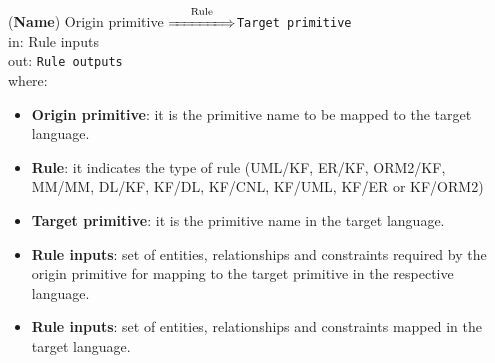 \documentclass[sn-mathphys]{sn-jnl}
\begin{document}
({\bf Name}) Origin primitive $\overset{\text{Rule}}{\xLongrightarrow{\hspace*{1.4cm}}}${\tt Target primitive}\\
\hspace*{0.3cm}in: Rule inputs\\
\hspace*{0.5cm}out: {\tt Rule outputs}\\

where:

\begin{itemize}
\item \textbf{Origin primitive}: it is the primitive name to be mapped to the target language.
\item \textbf{Rule}: it indicates the type of rule (UML/KF, ER/KF, ORM2/KF, MM/MM, DL/KF, KF/DL, KF/CNL, KF/UML, KF/ER or KF/ORM2)
\item \textbf{Target primitive}: it is the primitive name in the target language.
\item \textbf{Rule inputs}: set of entities, relationships and constraints required by the origin primitive for mapping to the target primitive in the respective language.
\item \textbf{Rule inputs}: set of entities, relationships and constraints mapped in the target language.
\end{itemize}
 



\end{document}
